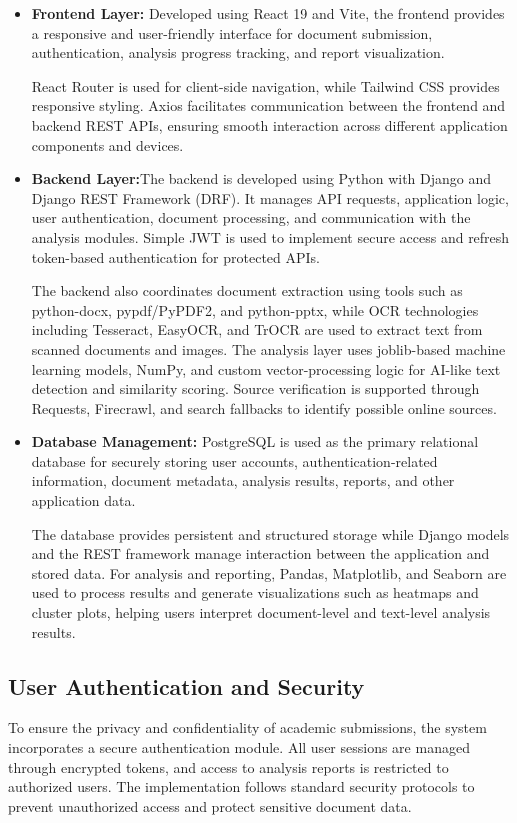 \documentclass[12pt, a4paper]{report}
\numberwithin{equation}{chapter}
\begin{document}
\begin{itemize}
    \item \textbf{Frontend Layer:} Developed using React 19 and Vite, the frontend provides a responsive and user-friendly interface for document submission, authentication, analysis progress tracking, and report visualization.
    
    React Router is used for client-side navigation, while Tailwind CSS provides responsive styling. Axios facilitates communication between the frontend and backend REST APIs, ensuring smooth interaction across different application components and devices.
    \item \textbf{Backend Layer:}The backend is developed using Python with Django and Django REST Framework (DRF). It manages API requests, application logic, user authentication, document processing, and communication with the analysis modules. Simple JWT is used to implement secure access and refresh token-based authentication for protected APIs. 
    
    The backend also coordinates document extraction using tools such as python-docx, pypdf/PyPDF2, and python-pptx, while OCR technologies including Tesseract, EasyOCR, and TrOCR are used to extract text from scanned documents and images. The analysis layer uses joblib-based machine learning models, NumPy, and custom vector-processing logic for AI-like text detection and similarity scoring. Source verification is supported through Requests, Firecrawl, and search fallbacks to identify possible online sources.
    \item \textbf{Database Management:} PostgreSQL is used as the primary relational database for securely storing user accounts, authentication-related information, document metadata, analysis results, reports, and other application data. 
    
    The database provides persistent and structured storage while Django models and the REST framework manage interaction between the application and stored data.
    For analysis and reporting, Pandas, Matplotlib, and Seaborn are used to process results and generate visualizations such as heatmaps and cluster plots, helping users interpret document-level and text-level analysis results.
\end{itemize}

\subsection{User Authentication and Security}
To ensure the privacy and confidentiality of academic submissions, the system incorporates a secure authentication module. All user sessions are managed through encrypted tokens, and access to analysis reports is restricted to authorized users. The implementation follows standard security protocols to prevent unauthorized access and protect sensitive document data.
\end{document}
